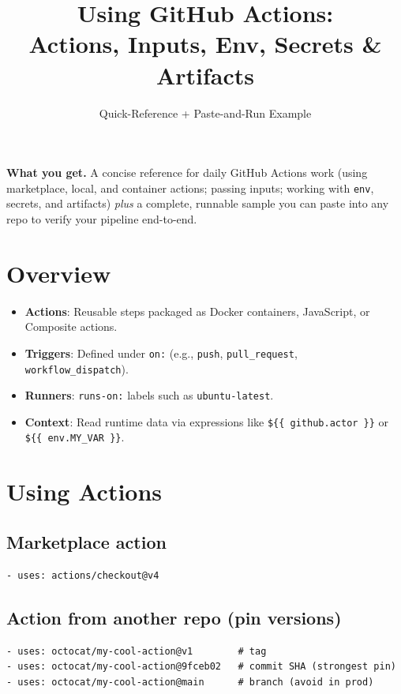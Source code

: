 \documentclass[11pt]{article}
\title{\textbf{Using GitHub Actions:}\\Actions, Inputs, Env, Secrets \& Artifacts}
\author{Quick-Reference + Paste-and-Run Example}
\date{}
\begin{document}
\maketitle
\vspace{-1.0em}

\noindent\textbf{What you get.} A concise reference for daily GitHub Actions work (using marketplace, local, and container actions; passing inputs; working with \texttt{env}, secrets, and artifacts) \emph{plus} a complete, runnable sample you can paste into any repo to verify your pipeline end-to-end.

\section{Overview}
\begin{itemize}
  \item \textbf{Actions}: Reusable steps packaged as Docker containers, JavaScript, or Composite actions.
  \item \textbf{Triggers}: Defined under \texttt{on:} (e.g., \texttt{push}, \texttt{pull\_request}, \texttt{workflow\_dispatch}).
  \item \textbf{Runners}: \texttt{runs-on:} labels such as \texttt{ubuntu-latest}.
  \item \textbf{Context}: Read runtime data via expressions like \texttt{\$\{\{ github.actor \}\}} or \texttt{\$\{\{ env.MY\_VAR \}\}}.
\end{itemize}

\section{Using Actions}
\subsection{Marketplace action}
\begin{verbatim}
- uses: actions/checkout@v4
\end{verbatim}

\subsection{Action from another repo (pin versions)}
\begin{verbatim}
- uses: octocat/my-cool-action@v1        # tag
- uses: octocat/my-cool-action@9fceb02   # commit SHA (strongest pin)
- uses: octocat/my-cool-action@main      # branch (avoid in prod)
\end{verbatim}
\end{document}

